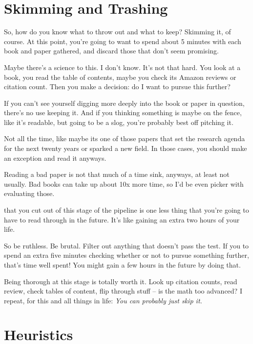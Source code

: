 \section{Skimming and Trashing}

So, how do you know what to throw out and what to keep? Skimming it, of
course. At this point, you're going to want to spend about 5 minutes with each
book and paper gathered, and discard those that don't seem promising.

Maybe there's a science to this. I don't know. It's not that hard. You look at a
book, you read the table of contents, maybe you check its Amazon reviews or
citation count. Then you make a decision: do I want to pursue this further?

If you can't see yourself digging more deeply into the book or paper in
question, there's no use keeping it. And if you thinking something is maybe on
the fence, like it's readable, but going to be a slog, you're probably best off
pitching it.

Not all the time, like maybe its one of those papers that set the research
agenda for the next twenty years or sparked a new field. In those cases, you
should make an exception and read it anyways.

Reading a bad paper is not that much of a time sink, anyways, at least not
usually. Bad books can take up about 10x more time, so I'd be even picker with
evaluating those.

 that you cut out of this stage of the
pipeline is one less thing that you're going to have to read through in the
future. It's like gaining an extra two hours of your life.

So be ruthless. Be brutal. Filter out anything that doesn't pass the test. If
you to spend an extra five minutes checking whether or not to pursue something
further, that's time well spent! You might gain a few hours in the future by
doing that.

Being thorough at this stage is totally worth it. Look up citation counts, read
review, check tables of content, flip through stuff -- is the math too advanced?
I repeat, for this and all things in life: \textit{You can probably just skip
  it.}

\section{Heuristics}

